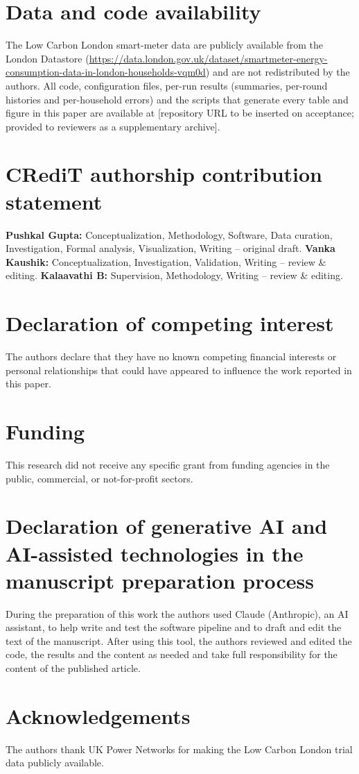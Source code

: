 \section*{Data and code availability}\label{sec:data}
The Low Carbon London smart-meter data are publicly available from the London Datastore
(\url{https://data.london.gov.uk/dataset/smartmeter-energy-consumption-data-in-london-households-vqm0d}) and are not
redistributed by the authors. All code, configuration files, per-run results (summaries, per-round histories and
per-household errors) and the scripts that generate every table and figure in this paper are available at
[repository URL to be inserted on acceptance; provided to reviewers as a supplementary archive].

\section*{CRediT authorship contribution statement}
\textbf{Pushkal Gupta:} Conceptualization, Methodology, Software, Data curation, Investigation, Formal analysis,
Visualization, Writing -- original draft.
\textbf{Vanka Kaushik:} Conceptualization, Investigation, Validation, Writing -- review \& editing.
\textbf{Kalaavathi B:} Supervision, Methodology, Writing -- review \& editing.

\section*{Declaration of competing interest}
The authors declare that they have no known competing financial interests or personal relationships that could have
appeared to influence the work reported in this paper.

\section*{Funding}
This research did not receive any specific grant from funding agencies in the public, commercial, or not-for-profit
sectors.

\section*{Declaration of generative AI and AI-assisted technologies in the manuscript preparation process}
During the preparation of this work the authors used Claude (Anthropic), an AI assistant, to help write and test
the software pipeline and to draft and edit the text of the manuscript. After using this tool, the authors reviewed
and edited the code, the results and the content as needed and take full responsibility for the content of the
published article.

\section*{Acknowledgements}
The authors thank UK Power Networks for making the Low Carbon London trial data publicly available.
